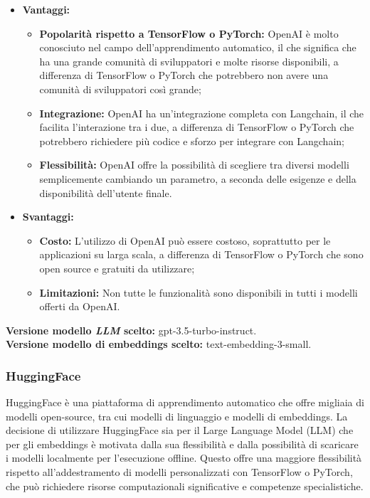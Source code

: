\documentclass[10pt, a4paper]{article}
\begin{document}
\begin{itemize}
\item \textbf{Vantaggi:}
\begin{itemize}
\item \textbf{Popolarità rispetto a TensorFlow o PyTorch:} OpenAI è molto conosciuto nel campo dell'apprendimento automatico, il che significa che ha una grande comunità di sviluppatori e molte risorse disponibili, a differenza di TensorFlow o PyTorch che potrebbero non avere una comunità di sviluppatori così grande;
\item \textbf{Integrazione:} OpenAI ha un'integrazione completa con Langchain, il che facilita l'interazione tra i due, a differenza di TensorFlow o PyTorch che potrebbero richiedere più codice e sforzo per integrare con Langchain;
\item \textbf{Flessibilità:} OpenAI offre la possibilità di scegliere tra diversi modelli semplicemente cambiando un parametro, a seconda delle esigenze e della disponibilità dell'utente finale.
\end{itemize}
\item \textbf{Svantaggi:}
\begin{itemize}
\item \textbf{Costo:} L'utilizzo di OpenAI può essere costoso, soprattutto per le applicazioni su larga scala, a differenza di TensorFlow o PyTorch che sono open source e gratuiti da utilizzare;
\item \textbf{Limitazioni:} Non tutte le funzionalità sono disponibili in tutti i modelli offerti da OpenAI.
\end{itemize}
\end{itemize}
\textbf{Versione modello \textit{LLM\pg} scelto:} gpt-3.5-turbo-instruct. \\
\textbf{Versione modello di embeddings scelto:} text-embedding-3-small.

\subsubsection{HuggingFace}
HuggingFace è una piattaforma di apprendimento automatico che offre migliaia di modelli open-source, tra cui modelli di linguaggio e modelli di embeddings. La decisione di utilizzare HuggingFace sia per il Large Language Model (LLM) che per gli embeddings è motivata dalla sua flessibilità e dalla possibilità di scaricare i modelli localmente per l’esecuzione offline. Questo offre una maggiore flessibilità rispetto all’addestramento di modelli personalizzati con TensorFlow o PyTorch, che può richiedere risorse computazionali significative e competenze specialistiche.
\end{document}
